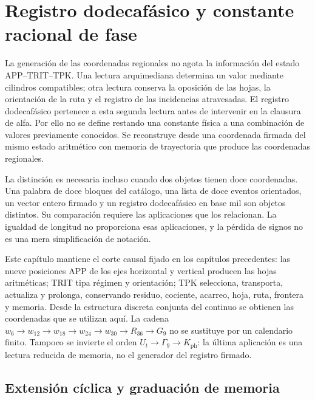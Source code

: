 \section{Registro dodecafásico y constante racional de fase}
\label{sec:k-registro}

La generación de las coordenadas regionales no agota la información del
estado APP--TRIT--TPK. Una lectura arquimediana determina un valor mediante
cilindros compatibles; otra lectura conserva la oposición de las hojas, la
orientación de la ruta y el registro de las incidencias atravesadas. El
registro dodecafásico pertenece a esta segunda lectura antes de intervenir en
la clausura de alfa. Por ello no se define restando una constante física a
una combinación de valores previamente conocidos. Se reconstruye desde una
coordenada firmada del mismo estado aritmético con memoria de trayectoria que produce las coordenadas
regionales.

La distinción es necesaria incluso cuando dos objetos tienen doce
coordenadas. Una palabra de doce bloques del catálogo, una lista de doce
eventos orientados, un vector entero firmado y un registro dodecafásico en base mil son
objetos distintos. Su comparación requiere las aplicaciones que los
relacionan. La igualdad de longitud no proporciona esas aplicaciones, y la
pérdida de signos no es una mera simplificación de notación.

Este capítulo mantiene el corte causal fijado en los capítulos precedentes:
las nueve posiciones APP de los ejes horizontal y vertical producen las
hojas aritméticas; TRIT tipa régimen y orientación; TPK selecciona,
transporta, actualiza y prolonga, conservando residuo, cociente, acarreo,
hoja, ruta, frontera y memoria. Desde la estructura discreta conjunta del
continuo se obtienen las coordenadas que se utilizan aquí. La cadena
\(w_6\to w_{12}\to w_{18}\to w_{24}\to w_{30}\to R_{36}\to G_9\)
no se sustituye por un calendario finito. Tampoco se invierte el orden
\(U_t\to\Gamma_9\to K_{\mathrm{ph}}\): la última aplicación es una
lectura reducida de memoria, no el generador del registro firmado.



\subsection{Extensión cíclica y graduación de memoria}
\label{subsec:k-calendario}

